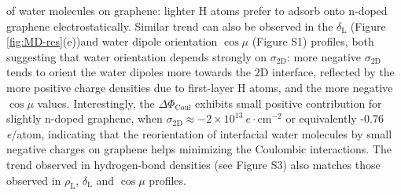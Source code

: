 of water molecules on graphene: lighter H atoms prefer to adsorb onto
n-doped graphene electrostatically. Similar trend can also be observed
in the \(\delta_{\mathrm{L}}\) (Figure \ref{fig:MD-res}(e))and water
dipole orientation \(\cos \mu\) (Figure S1) profiles, both
suggesting that water orientation depends strongly on
\(\sigma_{\mathrm{2D}}\): more negative \(\sigma_{\mathrm{2D}}\) tends
to orient the water dipoles more towards the 2D interface, reflected
by the more positive charge densities due to first-layer H atoms, and
the more negative \(\cos \mu\) values. Interestingly, the \(\Delta
\Phi_{\mathrm{Coul}}\) exhibits small positive contribution for slightly
n-doped graphene, when \(\sigma_{\mathrm{2D}} \approx -2\times10^{13}\
e\cdot \mathrm{cm}^{-2}\) or equivalently -0.76 \textit{e}/atom,
indicating that the reorientation of interfacial water molecules by
small negative charges on graphene helps minimizing the Coulombic
interactions. The trend observed in hydrogen-bond densities (see
Figure S3) also matches those observed in \(\rho_{\mathrm{L}}\),
\(\delta_{\mathrm{L}}\) and \(\cos \mu\) profiles.

